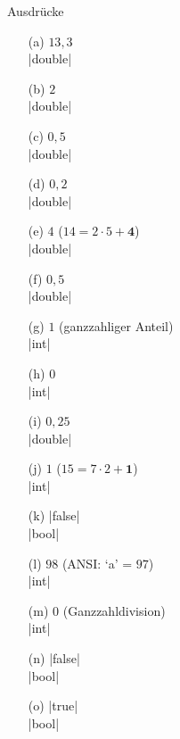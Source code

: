 \begin{exercise}{Ausdrücke}
\begin{solution}
\begin{center}
\begin{minipage}{0.3\textwidth}
\begin{itemize}
\item[(a)] $13{,}3$  \\ \code|double|
\item[(b)] $2$       \\ \code|double|
\item[(c)] $0{,}5$   \\ \code|double|
\item[(d)] $0{,}2$   \\ \code|double|
\item[(e)] $4$ ($14 = 2\cdot 5 + \boldsymbol{4}$) \\ \code|double|
\end{itemize}
\end{minipage}
\begin{minipage}{0.3\textwidth}
\begin{itemize}
\item[(f)] $0{,}5$   \\ \code|double|
\item[(g)] $1$ (ganzzahliger Anteil) \\ \code|int|
\item[(h)] $0$               \\ \code|int|
\item[(i)] $0{,}25$  \\ \code|double|
\item[(j)] $1$ ($15 = 7\cdot 2 + \boldsymbol{1}$) \\ \code|int|
\end{itemize}
\end{minipage}
\begin{minipage}{0.3\textwidth}
\begin{itemize}
\item[(k)] \code|false|          \\ \code|bool|
\item[(l)] $98$ (ANSI: `a' = $97$) \\ \code|int|
\item[(m)] $0$  (Ganzzahldivision) \\ \code|int|
\item[(n)] \code|false|      \\ \code|bool|
\item[(o)] \code|true|            \\ \code|bool|
\end{itemize}
\end{minipage}
\end{center}
\end{solution}

\end{exercise}
